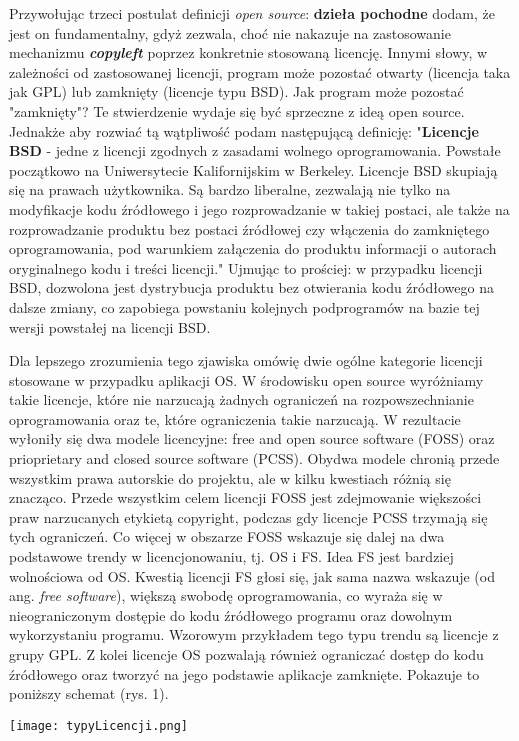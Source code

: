 \documentclass{article}
\begin{document}
Przywołując trzeci postulat definicji \emph{open source}: \textbf{dzieła pochodne} dodam, że jest on fundamentalny, gdyż zezwala, choć nie nakazuje na zastosowanie mechanizmu \textbf{\emph{copyleft}} poprzez konkretnie stosowaną licencję. Innymi słowy, w zależności od zastosowanej licencji, program może pozostać otwarty (licencja taka jak GPL) lub zamknięty (licencje typu BSD)\cite{Kotula}. Jak program może pozostać "zamknięty"? Te stwierdzenie wydaje się być sprzeczne z ideą open source. Jednakże aby rozwiać tą wątpliwość podam następującą definicję: "\textbf{Licencje BSD} - jedne z licencji zgodnych z zasadami wolnego oprogramowania. Powstałe początkowo na Uniwersytecie Kalifornijskim w Berkeley. Licencje BSD skupiają się na prawach użytkownika. Są bardzo liberalne, zezwalają nie tylko na modyfikacje kodu źródłowego i jego rozprowadzanie w takiej postaci, ale także na rozprowadzanie produktu bez postaci źródłowej czy włączenia do zamkniętego oprogramowania, pod warunkiem załączenia do produktu informacji o autorach oryginalnego kodu i treści licencji\cite{wikipedia}." Ujmując to prościej: w przypadku licencji BSD, dozwolona jest dystrybucja produktu bez otwierania kodu źródłowego na dalsze zmiany, co zapobiega powstaniu kolejnych podprogramów na bazie tej wersji powstałej na licencji BSD.

Dla lepszego zrozumienia tego zjawiska omówię dwie ogólne kategorie licencji stosowane w przypadku aplikacji OS. W środowisku open source wyróżniamy takie licencje, które nie narzucają żadnych ograniczeń na rozpowszechnianie oprogramowania oraz te, które ograniczenia takie narzucają. W rezultacie wyłoniły się dwa modele licencyjne: free and open source software (FOSS) oraz prioprietary and closed source software (PCSS). Obydwa modele chronią przede wszystkim prawa autorskie do projektu, ale w kilku kwestiach różnią się znacząco. Przede wszystkim celem licencji FOSS jest zdejmowanie większości praw narzucanych etykietą copyright, podczas gdy licencje PCSS trzymają się tych ograniczeń. Co więcej w obszarze FOSS wskazuje się dalej na dwa podstawowe trendy w licencjonowaniu, tj. OS i FS. Idea FS jest bardziej wolnościowa od OS. Kwestią licencji FS głosi się, jak sama nazwa wskazuje (od ang. \emph{free software}), większą swobodę oprogramowania, co wyraża się w nieograniczonym dostępie do kodu źródłowego programu oraz dowolnym wykorzystaniu programu. Wzorowym przykładem tego typu trendu są licencje z grupy GPL. Z kolei licencje OS pozwalają również ograniczać dostęp do kodu źródłowego oraz tworzyć na jego podstawie aplikacje zamknięte\cite{Kotula}. Pokazuje to poniższy schemat (rys. 1).
\begin{center}
    \texttt{[image: typyLicencji.png]}
\end{center}
\end{document}
